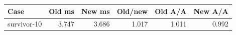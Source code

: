 \begin{center}\small
\begin{tabular}{lrrrrr}
\toprule
Case & Old ms & New ms & Old/new & Old A/A & New A/A \\
\midrule
survivor-10 & 3.747 & 3.686 & 1.017 & 1.011 & 0.992 \\
\bottomrule
\end{tabular}
\end{center}
